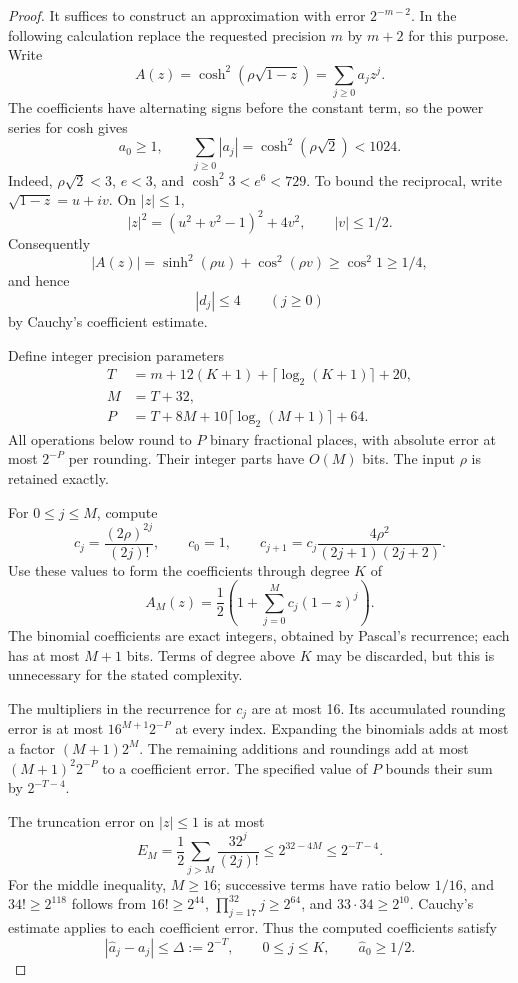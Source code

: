 \begin{proof}
It suffices to construct an approximation with error \(2^{-m-2}\).
In the following calculation replace the requested precision \(m\)
by \(m+2\) for this purpose.  Write
\[
 A(z)=\cosh^2(\rho\sqrt{1-z})=\sum_{j\ge0}a_jz^j.
\]
The coefficients have alternating signs before the constant term,
so the power series for cosh gives
\begin{equation}\label{eq:coefficient-norm}
 a_0\ge1,\qquad
 \sum_{j\ge0}|a_j|=\cosh^2(\rho\sqrt2)<1024.
\end{equation}
Indeed, \(\rho\sqrt2<3\), \(e<3\), and
\(\cosh^2 3<e^6<729\).  To bound the reciprocal, write
\(\sqrt{1-z}=u+iv\).  On \(|z|\le1\),
\[
 |z|^2=(u^2+v^2-1)^2+4v^2,
 \qquad |v|\le1/2.
\]
Consequently
\[
 |A(z)|=\sinh^2(\rho u)+\cos^2(\rho v)
 \ge\cos^2 1\ge1/4,
\]
and hence
\begin{equation}\label{eq:reciprocal-coefficient-bound}
 |d_j|\le4\qquad(j\ge0)
\end{equation}
by Cauchy's coefficient estimate.

Define integer precision parameters
\begin{align*}
 T&=m+12(K+1)+\lceil\log_2(K+1)\rceil+20,\\
 M&=T+32,\\
 P&=T+8M+10\lceil\log_2(M+1)\rceil+64.
\end{align*}
All operations below round to \(P\) binary fractional places, with
absolute error at most \(2^{-P}\) per rounding.  Their integer
parts have \(O(M)\) bits.  The input \(\rho\) is retained exactly.

For \(0\le j\le M\), compute
\[
 c_j=\frac{(2\rho)^{2j}}{(2j)!},\qquad
 c_0=1,\qquad
 c_{j+1}=c_j\frac{4\rho^2}{(2j+1)(2j+2)}.
\]
Use these values to form the coefficients through degree \(K\) of
\[
 A_M(z)=\frac12\left(1+\sum_{j=0}^M c_j(1-z)^j\right).
\]
The binomial coefficients are exact integers, obtained by Pascal's
recurrence; each has at most \(M+1\) bits.  Terms of degree above
\(K\) may be discarded, but this is unnecessary for the stated
complexity.

The multipliers in the recurrence for \(c_j\) are at most 16.
Its accumulated rounding error is at most
\(16^{M+1}2^{-P}\) at every index.  Expanding the binomials adds
at most a factor \((M+1)2^M\).  The remaining additions and
roundings add at most \((M+1)^2 2^{-P}\) to a coefficient error.
The specified value of \(P\) bounds their sum by
\(2^{-T-4}\).

The truncation error on \(|z|\le1\) is at most
\[
 E_M=\frac12\sum_{j>M}\frac{32^j}{(2j)!}
 \le2^{32-4M}\le2^{-T-4}.
\]
For the middle inequality, \(M\ge16\); successive terms have
ratio below \(1/16\), and
\(34!\ge2^{118}\) follows from
\(16!\ge2^{44}\), \(\prod_{j=17}^{32}j\ge2^{64}\), and
\(33\cdot34\ge2^{10}\).
Cauchy's estimate applies to each coefficient error.
Thus the computed coefficients satisfy
\begin{equation}\label{eq:coefficient-input-error}
 |\widehat a_j-a_j|\le\Delta:=2^{-T},\qquad 0\le j\le K,
 \qquad \widehat a_0\ge1/2.
\end{equation}


\end{proof}
